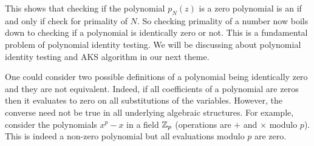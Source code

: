 This shows that checking if the polynomial $p_N(z)$ is a zero polynomial is an if and only if check for primality of $N$. 
So checking primality of a number now boils down to checking if a polynomial is identically zero or not. This is a fundamental problem of polynomial identity testing. We will be discussing about polynomial identity testing and AKS algorithm in our next theme.

\begin{remark}
One could consider two possible definitions of a polynomial being identically zero and they are not equivalent. Indeed, if all coefficients of a polynomial are zeros then it evaluates to zero on all substitutions of the variables. However, the converse need not be true in all underlying algebraic structures. For example, consider the polynomials $x^p -  x$ in a field ${\mathbb{Z}}_p$ (operations are $+$ and $\times$ modulo $p$). This is indeed a non-zero polynomial but all evaluations modulo $p$ are zero.
\end{remark}